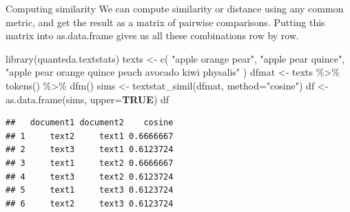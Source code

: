 \documentclass[
  10pt,
  ignorenonframetext,
  aspectratio=169]{beamer}
\newenvironment{Shaded}{\begin{snugshade}}{\end{snugshade}}
\newcommand{\AttributeTok}[1]{\textcolor[rgb]{0.80,0.80,0.80}{#1}}
\newcommand{\ConstantTok}[1]{\textcolor[rgb]{0.86,0.64,0.64}{\textbf{#1}}}
\newcommand{\FunctionTok}[1]{\textcolor[rgb]{0.94,0.94,0.56}{#1}}
\newcommand{\NormalTok}[1]{\textcolor[rgb]{0.80,0.80,0.80}{#1}}
\newcommand{\OtherTok}[1]{\textcolor[rgb]{0.94,0.94,0.56}{#1}}
\newcommand{\SpecialCharTok}[1]{\textcolor[rgb]{0.86,0.64,0.64}{#1}}
\newcommand{\StringTok}[1]{\textcolor[rgb]{0.80,0.58,0.58}{#1}}
\begin{document}
\begin{frame}[fragile]{Computing similarity}
\protect\hypertarget{computing-similarity-1}{}
We can compute similarity or distance using any common metric, and get
the result as a matrix of pairwise comparisons. Putting this matrix into
as.data.frame gives us all these combinations row by row.

\scriptsize

\begin{Shaded}
\begin{Highlighting}[]
\FunctionTok{library}\NormalTok{(quanteda.textstats)}
\NormalTok{texts }\OtherTok{\textless{}{-}} \FunctionTok{c}\NormalTok{(}
  \StringTok{"apple orange pear"}\NormalTok{, }\StringTok{"apple pear quince"}\NormalTok{,}
  \StringTok{"apple pear orange quince peach avocado kiwi physalis"}
\NormalTok{)}
\NormalTok{dfmat }\OtherTok{\textless{}{-}}\NormalTok{ texts }\SpecialCharTok{\%\textgreater{}\%} \FunctionTok{tokens}\NormalTok{() }\SpecialCharTok{\%\textgreater{}\%} \FunctionTok{dfm}\NormalTok{()}
\NormalTok{sims }\OtherTok{\textless{}{-}} \FunctionTok{textstat\_simil}\NormalTok{(dfmat, }\AttributeTok{method=}\StringTok{"cosine"}\NormalTok{)}
\NormalTok{df }\OtherTok{\textless{}{-}} \FunctionTok{as.data.frame}\NormalTok{(sims, }\AttributeTok{upper=}\ConstantTok{TRUE}\NormalTok{)}
\NormalTok{df}
\end{Highlighting}
\end{Shaded}

\begin{verbatim}
##   document1 document2    cosine
## 1     text2     text1 0.6666667
## 2     text3     text1 0.6123724
## 3     text1     text2 0.6666667
## 4     text3     text2 0.6123724
## 5     text1     text3 0.6123724
## 6     text2     text3 0.6123724
\end{verbatim}
\end{frame}
\end{document}
